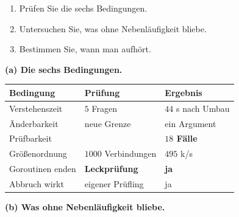 \begin{aufgabe}
\begin{enumerate}[label=(\alph*)]
\item Prüfen Sie die sechs Bedingungen.
\item Untersuchen Sie, was ohne Nebenläufigkeit bliebe.
\item Bestimmen Sie, wann man aufhört.
\end{enumerate}

\loesung
\textbf{(a) Die sechs Bedingungen.}

\begin{center}
{\small
\renewcommand{\arraystretch}{1.45}
\begin{tabular}{@{}P{3.0cm}P{2.4cm}P{2.6cm}@{}}
\toprule
\textbf{Bedingung} & \textbf{Prüfung} & \textbf{Ergebnis}\\
\midrule
Verstehenszeit & $5$ Fragen & \textcolor{mittel}{$44$ s nach Umbau}\\
Änderbarkeit & neue Grenze & \textcolor{gruen}{ein Argument}\\
Prüfbarkeit &  & \textcolor{gruen}{\textbf{$18$ Fälle}}\\
Größenordnung & $1000$ Verbindungen & \textcolor{gruen}{$495$ k/s}\\
Goroutinen enden & \textbf{Leckprüfung} & \textcolor{gruen}{\textbf{ja}}\\
Abbruch wirkt & eigener Prüfling & \textcolor{gruen}{ja}\\
\bottomrule
\end{tabular}}
\end{center}

\begin{center}
\begin{minipage}{0.88\textwidth}
\end{minipage}
\end{center}

\medskip
\textbf{(b) Was ohne Nebenläufigkeit bliebe.}


\end{aufgabe}
